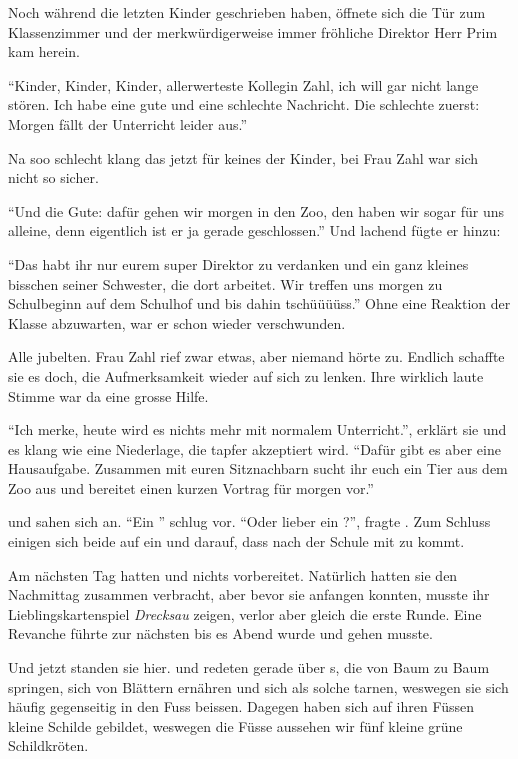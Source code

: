 Noch während die letzten Kinder geschrieben haben, öffnete sich die Tür zum Klassenzimmer und der merkwürdigerweise immer fröhliche Direktor Herr Prim kam herein.

\enquote{Kinder, Kinder, Kinder, allerwerteste Kollegin Zahl, ich will gar nicht lange stören. Ich habe eine gute und eine schlechte Nachricht. Die schlechte zuerst: Morgen fällt der Unterricht leider aus.}

Na soo schlecht klang das jetzt für keines der Kinder, bei Frau Zahl war sich  nicht so sicher.

\enquote{Und die Gute: dafür gehen wir morgen in den Zoo, den haben wir sogar für uns alleine, denn eigentlich ist er ja gerade geschlossen.} Und lachend fügte er hinzu:

\enquote{Das habt ihr nur eurem super Direktor zu verdanken und ein ganz kleines bisschen seiner Schwester, die dort arbeitet. Wir treffen uns morgen zu Schulbeginn auf dem Schulhof und bis dahin tschüüüüss.} Ohne eine Reaktion der Klasse abzuwarten, war er schon wieder verschwunden.

Alle jubelten. Frau Zahl rief zwar etwas, aber niemand hörte zu. Endlich schaffte sie es doch, die Aufmerksamkeit wieder auf sich zu lenken. Ihre wirklich laute Stimme war da eine grosse Hilfe.

\enquote{Ich merke, heute wird es nichts mehr mit normalem Unterricht.}, erklärt sie und es klang wie eine Niederlage, die tapfer akzeptiert wird. \enquote{Dafür gibt es aber eine Hausaufgabe. Zusammen mit euren Sitznachbarn sucht ihr euch ein Tier aus dem Zoo aus und bereitet einen kurzen Vortrag für morgen vor.}

 und  sahen sich an. \enquote{Ein } schlug  vor. \enquote{Oder lieber ein ?}, fragte . Zum Schluss einigen sich beide auf ein  und darauf, dass  nach der Schule mit zu  kommt.

Am nächsten Tag hatten  und  nichts vorbereitet. Natürlich hatten sie den Nachmittag zusammen verbracht, aber bevor sie anfangen konnten, musste   ihr Lieblingskartenspiel \textit{Drecksau} zeigen, verlor aber gleich die erste Runde. Eine Revanche führte zur nächsten bis es Abend wurde und  gehen musste.

Und jetzt standen sie hier.  und  redeten gerade über s, die von Baum zu Baum springen, sich von Blättern ernähren und sich als solche tarnen, weswegen sie sich häufig gegenseitig in den Fuss beissen. Dagegen haben sich auf ihren Füssen kleine Schilde gebildet, weswegen die Füsse aussehen wir fünf kleine grüne Schildkröten.


